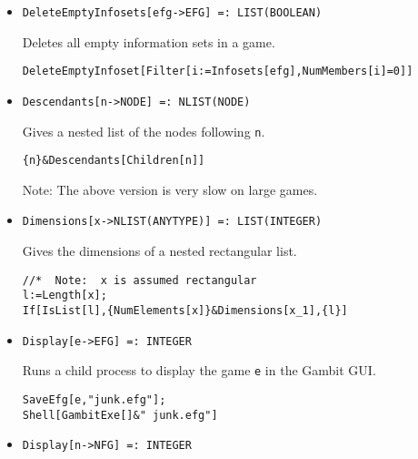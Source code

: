\begin{itemize}
\item{}
\protect \large \begin{verbatim}
DeleteEmptyInfosets[efg->EFG] =: LIST(BOOLEAN) 
\end{verbatim}\normalsize

\bd 
Deletes all empty information sets in a game.  
\begin{verbatim}
DeleteEmptyInfoset[Filter[i:=Infosets[efg],NumMembers[i]=0]]
\end{verbatim} 
\ed

\item{}
\protect \large \begin{verbatim}
Descendants[n->NODE] =: NLIST(NODE) 
\end{verbatim}\normalsize

\bd 
Gives a nested list of the nodes following \verb+n+.
\begin{verbatim}
{n}&Descendants[Children[n]]
\end{verbatim} 
\item[Note:] The above version is very slow on large games.
\ed

\item{}
\protect \large \begin{verbatim}
Dimensions[x->NLIST(ANYTYPE)] =: LIST(INTEGER) 
\end{verbatim}\normalsize

\bd 
Gives the dimensions of a nested rectangular list. 
\begin{verbatim}
//*  Note:  x is assumed rectangular
l:=Length[x];
If[IsList[l],{NumElements[x]}&Dimensions[x_1],{l}]
\end{verbatim} 
\ed


\item{}
\protect \large \begin{verbatim}
Display[e->EFG] =: INTEGER 
\end{verbatim}\normalsize

\bd 
Runs a child process to display the game \verb+e+ in the Gambit GUI. 
\begin{verbatim}
SaveEfg[e,"junk.efg"];
Shell[GambitExe[]&" junk.efg"]
\end{verbatim} 
\ed

\item{}
\protect \large \begin{verbatim}
Display[n->NFG] =: INTEGER 
\end{verbatim}\normalsize


\end{itemize}
